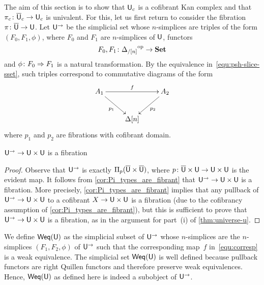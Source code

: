 \documentclass[reqno,10pt,a4paper,oneside,draft]{amsart}
\begin{document}
The aim of this section is to show that $\mathsf{U}_c$ is a cofibrant Kan complex and that $\pi_c \colon
\overline{\mathsf{U}}_c \to \mathsf{U}_c$ is univalent.  For this, let us first return to consider the fibration $\pi \colon \overline{\mathsf{U}} \to \mathsf{U}$. Let $\mathsf{U}^{\rightarrow}$ be the simplicial set whose $n$-simplices are triples of the form $(F_0, F_1, \phi)$, where $F_0$ and $F_1$ are $n$-simplices of $\mathsf{U}$, \ie functors
 \[
F_0, F_1 \colon {\Delta_{/[n]}}^{\operatorname{op}} \rightarrow \mathbf{Set}
\]
and $\phi \colon F_0 \Rightarrow F_1$ is a natural transformation. By the equivalence in~\eqref{equ:psh-slice-sset},
such triples correspond to commutative diagrams of the form
\begin{equation}
\label{equ:corresp}
\begin{gathered}
\xymatrix{ 
A_1 \ar[rr]^{f} \ar[dr]_{p_1} & & A_2 \ar[dl]^{p_2} \\
& \Delta[n] & }
\end{gathered}
\end{equation}
where $p_1$ and $p_2$ are fibrations with cofibrant domain.


\begin{lemma} $\mathsf{U}^{\rightarrow} \rightarrow \mathsf{U} \times \mathsf{U}$ is a fibration
\end{lemma}

\begin{proof} Observe that $\mathsf{U}^{\rightarrow}$ is exactly $\Pi_p(\overline{\mathsf{U}} \times \overline{\mathsf{U}})$, 
where $p \colon \overline{\mathsf{U}} \times \mathsf{U} \rightarrow \mathsf{U} \times \mathsf{U}$ is the evident map. 
It follows from \cref{cor:Pi_types_are_fibrant} that $\mathsf{U}^{\rightarrow} \rightarrow \mathsf{U} \times \mathsf{U}$ is a fibration.
More precisely, \cref{cor:Pi_types_are_fibrant} implies that any pullback of  $\mathsf{U}^{\rightarrow} \rightarrow \mathsf{U} \times \mathsf{U}$ to a cofibrant
$X \rightarrow \mathsf{U} \times \mathsf{U}$ is a fibration (due to the cofibrancy assumption of  \cref{cor:Pi_types_are_fibrant}),
but this is sufficient to prove that $\mathsf{U}^{\rightarrow} \rightarrow \mathsf{U} \times \mathsf{U}$ is a fibration,
as in the argument for part~(i) of  \cref{thm:universe-u}.
\end{proof}


We define $\mathsf{Weq}(\mathsf{U})$ as the simplicial subset of $\mathsf{U}^\to$ whose $n$-simplices are the $n$-simplices $(F_1, F_2, \phi)$ of $\mathsf{U}^\to$ such that the corresponding map~$f$ in~\eqref{equ:corresp} is a weak equivalence.
The simplicial set $\mathsf{Weq}(\mathsf{U})$ is well defined because pullback functors are right Quillen functors \cite{henry2019qms} and therefore preserve weak equivalences. Hence, 
$\mathsf{Weq}(\mathsf{U})$ as defined here is indeed a subobject of $\mathsf{U}^{\rightarrow}$. 
\end{document}
